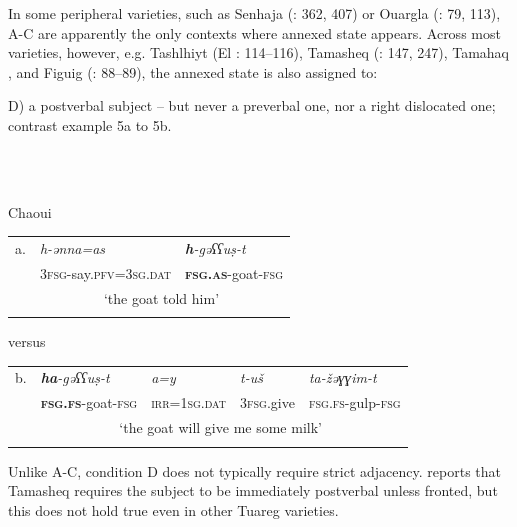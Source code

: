 \documentclass[output=paper]{langscibook}
\begin{document}
\begin{styleStandarduser}
In some peripheral varieties, such as Senhaja (\citealt{Gutova2021}: 362, 407) or Ouargla (\citealt{DelheureOchoa2019}: 79, 113), A-C are apparently the only contexts where annexed state appears. Across most varieties, however, e.g. Tashlhiyt (El \citealt{Moujahid1997}: 114–116), Tamasheq (\citealt{Heath2005a}: 147, 247), Tamahaq \citep[25]{Cortade1969}, and Figuig (\citealt{Kossmann2016,Kossmann1997}: 88–89), the annexed state is also assigned to:
\end{styleStandarduser}

\begin{styleStandarduser}
D) a postverbal subject – but never a preverbal one, nor a right dislocated one; contrast example 5a to 5b.
\end{styleStandarduser}

\begin{styleStandarduser}
\ea%
    \label{ex:key:5}
    \gll \\
         \\
    \glt
    \z %

          Chaoui \citep[135]{Djarallah1993}
\end{styleStandarduser}


\begin{tabularx}{\textwidth}{XXX}

\lsptoprule
a. & \textit{h-ənna=as} & \textbf{\textit{h}}\textit{{}-gəʕʕuṣ-t}\\
& \textsc{3fsg}{}-say.\textsc{pfv}=\textsc{3sg.dat} & \textbf{\textsc{fsg.as}}{}-goat-\textsc{fsg}\\
& \multicolumn{2}{c}{‘the goat told him’}\\
\lspbottomrule
\end{tabularx}
\begin{styleStandarduser}
versus
\end{styleStandarduser}


\begin{tabularx}{\textwidth}{XXXXX}

\lsptoprule
b. & \textbf{\textit{ha}}\textit{{}-gəʕʕuṣ-t} & \textit{a=y} & \textit{t-uš} & \textit{ta-žəɣɣim-t}\\
& \textbf{\textsc{fsg.fs}}\textsc{{}-}goat\textsc{{}-fsg} & \textsc{irr=1sg.dat} & \textsc{3fsg}.give & \textsc{fsg.fs-}gulp\textsc{{}-fsg}\\
& \multicolumn{4}{c}{‘the goat will give me some milk’}\\
\lspbottomrule
\end{tabularx}
\begin{styleStandarduser}
Unlike A-C, condition D does not typically require strict adjacency. \citet[573]{Heath2005a} reports that Tamasheq requires the subject to be immediately postverbal unless fronted, but this does not hold true even in other Tuareg varieties.
\end{styleStandarduser}
\end{document}
